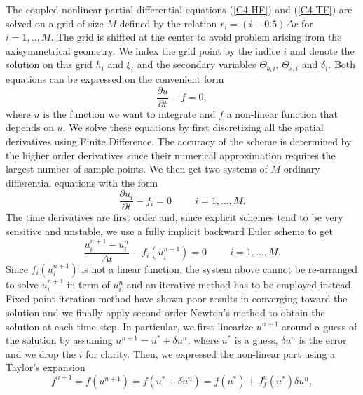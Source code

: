 The coupled nonlinear partial differential equations (\ref{C4-HF}) and
(\ref{C4-TF}) are solved on a grid of size $M$ defined by the relation
$r_i =  (i-0.5)\Delta r$ for  $i=1,..,M$. The  grid is shifted  at the
center to avoid  problem arising from the  axisymmetrical geometry. We
index the grid point by the indice $i$ and denote the solution on this
grid  $h_i$ and  $\xi_i$ and  the secondary  variables $\Theta_{b,i}$,
$\Theta_{s,i}$ and $\delta_i$. Both equations  can be expressed on the
convenient form
\begin{equation}
  \frac{\partial u}{\partial t} - f = 0,
\end{equation}
where $u$  is the function we  want to integrate and  $f$ a non-linear
function  that depends  on $u$.   We  solve these  equations by  first
discretizing all the spatial  derivatives using Finite Difference. The
accuracy of the  scheme is determined by the  higher order derivatives
since  their numerical  approximation requires  the largest  number of
sample points.  We  then get two systems of  $M$ ordinary differential
equations with the form
\begin{equation}
  \frac{\partial u_i}{\partial t} - f_i = 0 \hspace{1cm} i = 1,...,M.
\end{equation}
The time derivatives are first  order and, since explicit schemes tend
to be  very sensitive and unstable,  we use a fully  implicit backward
Euler scheme to get
\begin{equation}
  \frac{u_i^{n+1}-u_i^n}{\Delta t} - f_i(u_i^{n+1}) = 0 \hspace{1cm} i
  = 1,...,M.
  \label{C4-Num-1}
\end{equation}
Since  $f_i(u_i^{n+1})$ is  not a  linear function,  the system  above
cannot be re-arranged to solve $u_i^{n+1}$ in term of $u_i^{n}$ and an
iterative method  has to  be employed  instead. Fixed  point iteration
method have shown  poor results in converging toward  the solution and
we finally apply  second order Newton's method to  obtain the solution
at each time step.  In particular, we first linearize $u^{n+1}$ around
a guess  of the solution  by assuming $u^{n+1}=u^*+\delta  u^n$, where
$u^*$ is a  guess, $\delta u^n$ is  the error and we drop  the $i$ for
clarity.   Then, we  expressed the  non-linear part  using a  Taylor's
expansion
\begin{equation}
  f^{n+1}=f(u^{n+1})=f(u^*+\delta
  u^n)=f(u^*)+J^u_{f}(u^*)\delta u^n,
  \label{C4-Fn1}
\end{equation}
